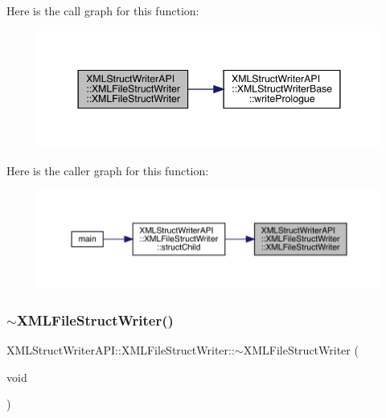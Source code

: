 Here is the call graph for this function\+:
\nopagebreak
\begin{figure}[H]
\begin{center}
\leavevmode
\includegraphics[width=344pt]{db/de3/classXMLStructWriterAPI_1_1XMLFileStructWriter_a7045796a887cf66a8ee5a355a1f3c4a9_cgraph}
\end{center}
\end{figure}
Here is the caller graph for this function\+:\nopagebreak
\begin{figure}[H]
\begin{center}
\leavevmode
\includegraphics[width=350pt]{db/de3/classXMLStructWriterAPI_1_1XMLFileStructWriter_a7045796a887cf66a8ee5a355a1f3c4a9_icgraph}
\end{center}
\end{figure}
\mbox{\label{classXMLStructWriterAPI_1_1XMLFileStructWriter_a28ac83ac02b6b4e4e67f9a767320155d}} 
\subsubsection{\texorpdfstring{$\sim$XMLFileStructWriter()}{~XMLFileStructWriter()}\hspace{0.1cm}{\footnotesize\ttfamily [1/2]}}
{\footnotesize\ttfamily X\+M\+L\+Struct\+Writer\+A\+P\+I\+::\+X\+M\+L\+File\+Struct\+Writer\+::$\sim$\+X\+M\+L\+File\+Struct\+Writer (\begin{DoxyParamCaption}\item[{void}]{ }\end{DoxyParamCaption})\hspace{0.3cm}{\ttfamily [inline]}}

